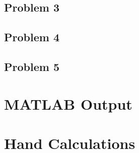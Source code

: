 \documentclass[]{article}
\begin{document}
	\newpage
	\subsection{Problem 3}
	
	
	\newpage
	\subsection{Problem 4}
	
	\newpage
		
	
	\newpage
	\subsection{Problem 5}
	
	\newpage
	
	\newpage
	
	\newpage
	

\section{MATLAB Output}
	
	
\section{Hand Calculations}
	
\end{document}
